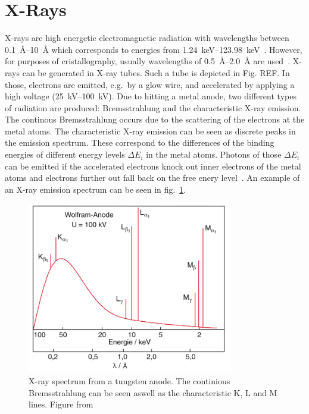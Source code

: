  
\section{X-Rays}\label{sec:Q1}

X-rays are high energetic electromagnetic radiation with wavelengths between \SIrange{0.1}{10}{\angstrom} which corresponds to energies from \SIrange{1.24}{123.98}{\kilo\eV}~\cite{Bohm.2021}. However, for purposes of cristallography, usually wavelengths of \SIrange{0.5}{2.0}{\angstrom} are used~\cite{Schwarzenbach.2001}. X-rays can be generated in X-ray tubes. Such a tube is depicted in Fig. REF. In those, electrons are emitted, e.g.~by a glow wire, and accelerated by applying a high voltage (\SIrange{25}{100}{\kilo\V}). Due to hitting a metal anode, two different types of radiation are produced: Bremsstrahlung and the characteristic X-ray emission. The continous Bremsstrahlung occurs due to the scattering of the electrons at the metal atoms. The characteristic X-ray emission can be seen as discrete peaks in the emission spectrum. These correspond to the differences of the binding energies of different energy levels $\Delta E_i$ in the metal atoms. Photons of those $\Delta E_i$ can be emitted if the accelerated electrons knock out inner electrons of the metal atoms and electrons further out fall back on the free enery level~\cite{Bohm.2021}. An example of an X-ray emission spectrum can be seen in fig.~\ref{fig:xRaySpectrum}. \par 

\begin{figure}[ht]
    \centering
    \includegraphics[width = 0.8\textwidth]{Bilder/Grundlagen/xraySpectrum.png}
    \caption{X-ray spectrum from a tungsten anode. The continious Bremsstrahlung can be seen aswell as the characteristic K, L and M lines. Figure from \cite{Demtroeder.2016}}
    \label{fig:xRaySpectrum}
\end{figure}

